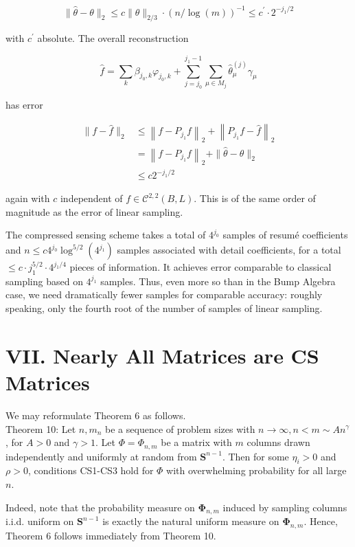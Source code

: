 \documentclass[10pt]{article}
\begin{document}
$$
\|\hat{\theta}-\theta\|_{2} \leq c\|\theta\|_{2 / 3} \cdot(n / \log (m))^{-1} \leq c^{\prime} \cdot 2^{-j_{1} / 2}
$$

with $c^{\prime}$ absolute. The overall reconstruction

$$
\hat{f}=\sum_{k} \beta_{j_{0}, k} \varphi_{j_{0}, k}+\sum_{j=j_{0}}^{j_{1}-1} \sum_{\mu \in M_{j}} \hat{\theta}_{\mu}^{(j)} \gamma_{\mu}
$$

has error

$$
\begin{aligned}
\|f-\hat{f}\|_{2} & \leq\left\|f-P_{j_{1}} f\right\|_{2}+\left\|P_{j_{1}} f-\hat{f}\right\|_{2} \\
& =\left\|f-P_{j_{1}} f\right\|_{2}+\|\hat{\theta}-\theta\|_{2} \\
& \leq c 2^{-j_{1} / 2}
\end{aligned}
$$

again with $c$ independent of $f \in \mathcal{C}^{2,2}(B, L)$. This is of the same order of magnitude as the error of linear sampling.

The compressed sensing scheme takes a total of $4^{j_{0}}$ samples of resumé coefficients and $n \leq c 4^{j_{0}} \log ^{5 / 2}\left(4^{j_{1}}\right)$ samples associated with detail coefficients, for a total $\leq c \cdot j_{1}^{5 / 2} \cdot 4^{j_{1} / 4}$ pieces of information. It achieves error comparable to classical sampling based on $4^{j_{1}}$ samples. Thus, even more so than in the Bump Algebra case, we need dramatically fewer samples for comparable accuracy: roughly speaking, only the fourth root of the number of samples of linear sampling.

\section*{VII. Nearly All Matrices are CS Matrices}
We may reformulate Theorem 6 as follows.\\
Theorem 10: Let $n, m_{n}$ be a sequence of problem sizes with $n \rightarrow \infty, n<m \sim A n^{\gamma}$, for $A>0$ and $\gamma>1$. Let $\Phi= \Phi_{n, m}$ be a matrix with $m$ columns drawn independently and uniformly at random from $\boldsymbol{S}^{n-1}$. Then for some $\eta_{i}>0$ and $\rho>0$, conditions CS1-CS3 hold for $\Phi$ with overwhelming probability for all large $n$.

Indeed, note that the probability measure on $\boldsymbol{\Phi}_{n, m}$ induced by sampling columns i.i.d. uniform on $\boldsymbol{S}^{n-1}$ is exactly the natural uniform measure on $\boldsymbol{\Phi}_{n, m}$. Hence, Theorem 6 follows immediately from Theorem 10.
\end{document}
